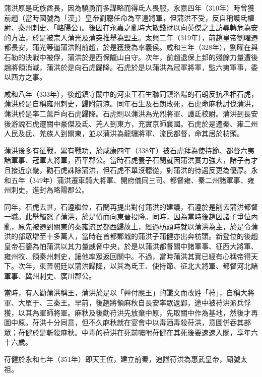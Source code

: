 蒲洪原是氐族酋長，因為驍勇而多謀略而得氐人畏服，永嘉四年（310年）時曾獲前趙（當時國號為「漢」）皇帝劉聰任命為平遠將軍，但蒲洪不受，反自稱護氐權尉、秦州刺史、「略陽公」。後因在永嘉之亂時大散錢財以向英傑之士訪尋轉危為安的方法，於是被宗人蒲光及蒲突推舉為盟主。太興二年（319年），前趙皇帝劉曜遷都長安，蒲光等逼蒲洪附前趙，於是獲授為率義侯。咸和三年（328年），劉曜在與石勒的決戰中被俘，蒲洪於是西保隴山自守。次年，前趙退保上邽的殘餘力量遭後趙將領消滅，蒲洪於是向石虎歸降。石虎於是以蒲洪為冠軍將軍，監六夷軍事，委以西方之事。

咸和八年（333年），後趙鎮守關中的河東王石生聯同鎮洛陽的石朗反抗丞相石虎，蒲洪於是自稱雍州刺史，歸附前涼。同年石生及石朗敗死，石虎命麻秋討伐蒲洪，蒲洪於是率二萬戶向石虎歸降。石虎則以蒲洪為光烈將軍、護氐校尉。蒲洪到長安後游說石虎遷關中豪傑及氐、羌人到東方，充實京師襄國。石虎於是遷秦、雍二州人民及氐、羌族人到關東，並以蒲洪為龍驤將軍、流民都督，命其居於枋頭。

蒲洪後多有征戰，累有戰功，於咸康四年（338年）被石虎拜為使持節、都督六夷諸軍事、冠軍大將軍，西平郡公。當時石虎養子石閔就因蒲洪實力強大，諸子有才且接近京畿，勸石虎誅除蒲洪，但石虎不單沒聽從，對蒲洪的待遇反更為優厚。永和五年（349年）蒲洪遷車騎大將軍、開府儀同三司、都督雍、秦二州諸軍事、雍州刺史，進封為略陽郡公。

同年，石虎去世，石遵繼位，石閔再提出對付蒲洪的建議，石遵於是削去蒲洪都督一職。此舉觸怒了蒲洪，於是憤而向東晉投降。同時，因為當時後趙因諸子爭位內亂，原先被遷到關東的秦雍流民都西歸故土，經過枋頭時就以蒲洪為主，於是令蒲洪的部眾增至十多萬人，當時在首都鄴城的蒲洪子蒲健亦出奔枋頭。新登位的後趙皇帝石鑒為怕蒲洪以其力量威脅中央，於是以蒲洪都督關中諸軍事、征西大將軍、雍州牧、領秦州刺史，讓他率眾返回關中。不過，當時蒲洪其實已經有心稱帝得天下。次年，東晉朝廷以蒲洪歸降，以其為氐王、使持節、征北大將軍、都督河北諸軍事、冀州刺史、廣川郡公。

當時，有人勸蒲洪稱王，蒲洪於是以「艸付應王」的讖文而改姓「苻」，自稱大將軍、大單于、三秦王。早前，後趙將領麻秋自長安率眾返鄴，途中被苻洪派兵俘獲，以其為軍師將軍。麻秋及後勸苻洪先放棄中原，先取關中作為基地，然後才再圖中原。苻洪十分同意，但不久麻秋就在宴會中以毒酒毒殺苻洪，意圖併吞其部眾；苻健於是斬殺麻秋。中毒的苻洪在死前囑咐苻健在其死後要速速入關，享年六十六歲。

苻健於永和七年（351年）即天王位，建立前秦，追諡苻洪為惠武皇帝，廟號太祖。








  